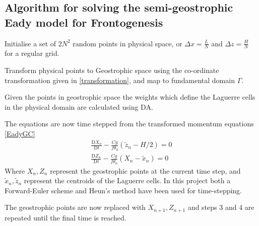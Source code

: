 \subsection{Algorithm for solving the semi-geostrophic Eady model for Frontogenesis \label{Algorithm}}
\begin{description}
	\setlength{\parskip}{0pt}
	\setlength{\itemsep}{0pt}
	\item[Step 1] Initialise a set of $2N^2$ random points in physical space, or $\Delta x = \frac{L}{N}$ and $\Delta z = \frac{H}{N}$ for a regular grid. 
	\item[Step 2] Transform physical points to Geostrophic space using the co-ordinate transformation given in \ref{transformation}, and map to fundamental domain $\Gamma$.
	\item[Step 3] Given the points in geostrophic space the weights which define the Laguerre cells in the physical domain are calculated using DA.
	\item[Step 4] The equations are now time stepped from the transformed momentum equations \ref{EadyGC} 
	\begin{equation*}
		\begin{aligned}
			\frac{\mathrm{D}X_{n}}{\mathrm{D}t} -\frac{Cg}{f\theta _0}\left(\tilde{z}_n-H/2\right) = 0 \\
			\frac{\mathrm{D}Z_{n}}{\mathrm{D}t} - \frac{Cg}{f\theta_0}\left(X_n - \tilde{x}_n\right) = 0
		\end{aligned}
	\end{equation*}
	Where $X_n, Z_n$ represent the geostrophic points at the current time step, and $\tilde{x}_n,\tilde{z}_n$ represent the centroids of the Laguerre cells. In this project both a Forward-Euler scheme and Heun's method have been used for time-stepping.
	\item[Step 5] The geostrophic points are now replaced with $X_{n+1}, Z_{n+1}$ and steps 3 and 4 are repeated until the final time is reached.
\end{description}
